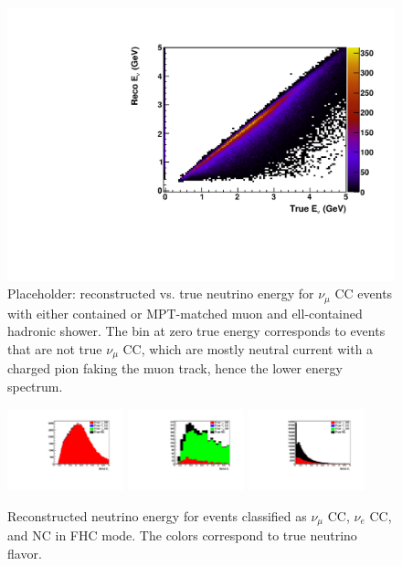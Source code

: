 \begin{figure}
\includegraphics[width=\textwidth]{graphics/true_reco_Ev.pdf}
\caption{Placeholder: reconstructed vs. true neutrino energy for $\nu_{\mu}$ CC events with either contained or MPT-matched muon and ell-contained hadronic shower. The bin at zero true energy corresponds to events that are not true $\nu_{\mu}$ CC, which are mostly neutral current with a charged pion faking the muon track, hence the lower energy spectrum.}
\label{fig:truerecoEv}
\end{figure}

\begin{figure}
\includegraphics[width=0.3\textwidth]{graphics/recoE_muCC.pdf}
\includegraphics[width=0.3\textwidth]{graphics/recoE_eCC.pdf}
\includegraphics[width=0.3\textwidth]{graphics/recoE_NC.pdf}
\caption{Reconstructed neutrino energy for events classified as $\nu_{\mu}$ CC, $\nu_{e}$ CC, and NC in FHC mode. The colors correspond to true neutrino flavor.}
\label{fig:recoEvcats}
\end{figure}

